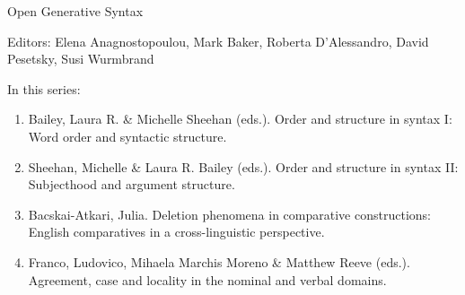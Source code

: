 {\large Open Generative Syntax}

\bigskip

Editors:   Elena Anagnostopoulou,
    Mark Baker,
    Roberta D’Alessandro,
    David Pesetsky,
    Susi Wurmbrand


\bigskip

In this series:

\begin{enumerate}
\item Bailey, Laura R. \& Michelle Sheehan (eds.). Order and structure in syntax I: Word order and syntactic structure.
\item Sheehan, Michelle \& Laura R. Bailey (eds.).  Order and structure in syntax II: Subjecthood and argument structure.
\item Bacskai-Atkari, Julia. Deletion phenomena in comparative constructions: English comparatives in a cross-linguistic perspective.
\item Franco, Ludovico, Mihaela Marchis Moreno \& Matthew Reeve (eds.). Agreement, case and locality in the nominal and verbal domains.
\end{enumerate}



\vfill



